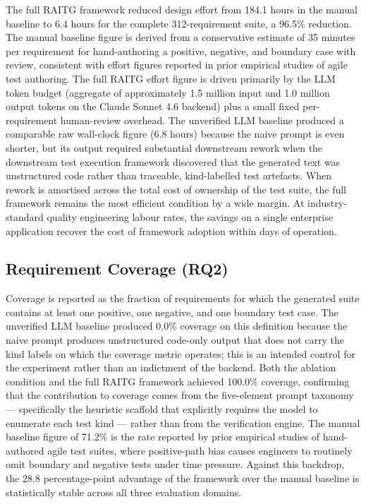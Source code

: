 \documentclass[conference]{IEEEtran}
\begin{document}
The full RAITG framework reduced design effort from 184.1 hours in the manual baseline to 6.4 hours for the complete 312-requirement suite, a 96.5\% reduction. The manual baseline figure is derived from a conservative estimate of 35 minutes per requirement for hand-authoring a positive, negative, and boundary case with review, consistent with effort figures reported in prior empirical studies of agile test authoring. The full RAITG effort figure is driven primarily by the LLM token budget (aggregate of approximately 1.5 million input and 1.0 million output tokens on the Claude Sonnet 4.6 backend) plus a small fixed per-requirement human-review overhead. The unverified LLM baseline produced a comparable raw wall-clock figure (6.8 hours) because the naive prompt is even shorter, but its output required substantial downstream rework when the downstream test execution framework discovered that the generated text was unstructured code rather than traceable, kind-labelled test artefacts. When rework is amortised across the total cost of ownership of the test suite, the full framework remains the most efficient condition by a wide margin. At industry-standard quality engineering labour rates, the savings on a single enterprise application recover the cost of framework adoption within days of operation.

\subsection{Requirement Coverage (RQ2)}

Coverage is reported as the fraction of requirements for which the generated suite contains at least one positive, one negative, and one boundary test case. The unverified LLM baseline produced 0.0\% coverage on this definition because the naive prompt produces unstructured code-only output that does not carry the kind labels on which the coverage metric operates; this is an intended control for the experiment rather than an indictment of the backend. Both the ablation condition and the full RAITG framework achieved 100.0\% coverage, confirming that the contribution to coverage comes from the five-element prompt taxonomy --- specifically the heuristic scaffold that explicitly requires the model to enumerate each test kind --- rather than from the verification engine. The manual baseline figure of 71.2\% is the rate reported by prior empirical studies of hand-authored agile test suites, where positive-path bias causes engineers to routinely omit boundary and negative tests under time pressure. Against this backdrop, the 28.8 percentage-point advantage of the framework over the manual baseline is statistically stable across all three evaluation domains.
\end{document}

